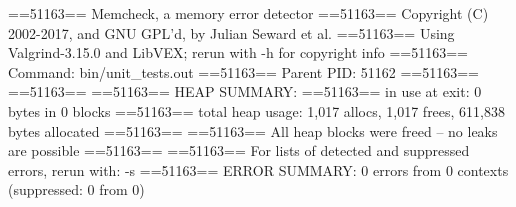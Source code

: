 ==51163== Memcheck, a memory error detector
==51163== Copyright (C) 2002-2017, and GNU GPL'd, by Julian Seward et al.
==51163== Using Valgrind-3.15.0 and LibVEX; rerun with -h for copyright info
==51163== Command: bin/unit_tests.out
==51163== Parent PID: 51162
==51163== 
==51163== 
==51163== HEAP SUMMARY:
==51163==     in use at exit: 0 bytes in 0 blocks
==51163==   total heap usage: 1,017 allocs, 1,017 frees, 611,838 bytes allocated
==51163== 
==51163== All heap blocks were freed -- no leaks are possible
==51163== 
==51163== For lists of detected and suppressed errors, rerun with: -s
==51163== ERROR SUMMARY: 0 errors from 0 contexts (suppressed: 0 from 0)
